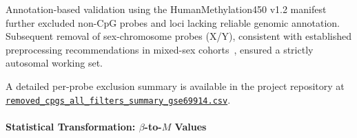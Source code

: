 Annotation-based validation using the HumanMethylation450 v1.2 manifest~\cite{Illumina450kManifest} further excluded non-CpG probes and loci lacking reliable genomic annotation. Subsequent removal of sex-chromosome probes (X/Y), consistent with established  preprocessing recommendations in mixed-sex cohorts~\cite{maksimovic2012, Wang2022InterpolatedXY}, ensured a strictly autosomal working set.

A detailed per-probe exclusion summary is available in the project repository at  
\href{https://github.com/elisabettaroviera/THESIS/blob/main/05%20-%20CpG%20list/Removed%20CpGs%20per%20Dataset/removed_cpgs_all_filters_summary_gse69914.csv}
{\texttt{removed\_cpgs\_all\_filters\_summary\_gse69914.csv}}.


\paragraph{Statistical Transformation: $\beta$-to-$M$ Values}
\label{par:gse69914_step4}

